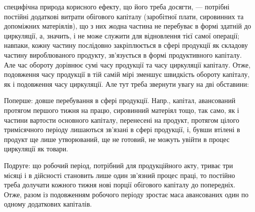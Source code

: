 \parcont{}  %
специфічна природа корисного ефекту, що його треба досягти, — потрібні
постійні додаткові витрати обігового капіталу (заробітної плати, сировинних
та допоміжних матеріялів), що з них жодна частина не перебуває в формі
здатній до циркуляції, а, значить, і не може служити для відновлення тієї
самої операції; навпаки, кожну частину послідовно закріплюється в сфері
продукції як складову частину вироблюваного продукту, зв’язується в
формі продуктивного капіталу. Але час обороту дорівнює сумі часу продукції
та часу циркуляції капіталу. Отже, подовження часу продукції в
тій самій мірі зменшує швидкість обороту капіталу, як і подовження часу
циркуляції. Але тут треба звернути увагу на дві обставини:

Поперше: довше перебування в сфері продукції. Напр., капітал, авансований
протягом першого тижня на працю, сировинний матеріял тощо,
так само, як і частини вартости основного капіталу, перенесені на продукт,
протягом цілого тримісячного періоду лишаються зв’язані в сфері
продукції, і, бувши втілені в продукт ще лише утворюваний, ще не готовий,
не можуть увійти в процес циркуляції як товари.

Подруге: що робочий період, потрібний для продукційного акту, триває
три місяці і в дійсності становить лише один зв’язний процес праці,
то постійно треба долучати кожного тижня нові порції обігового капіталу
до попередніх. Отже, разом із подовженням робочого періоду
зростає маса авансованих один по одному додаткових капіталів.

